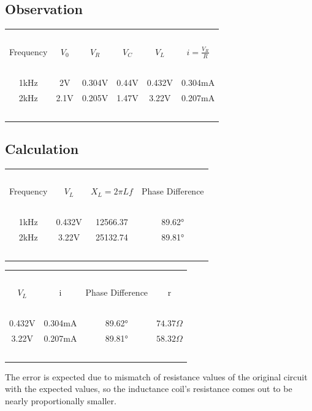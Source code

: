 \documentclass{article}
\begin{document}
\subsection{Observation}
\vspace{5px}
\begin{center}
\begin{tabular}{| c | c | c | c | c | c |} 
 \hline
    \ & \ & \ & \ & \ & \ \\
    Frequency & $V_0$ & $V_R$ & $V_C$ & $V_L$ & $i=\frac{V_R}{R}$\\ [1em]
    \hline
    \ & \ & \ & \ & \ & \ \\
    1kHz & 2V & 0.304V & 0.44V & 0.432V & 0.304mA \\
    2kHz & 2.1V & 0.205V & 1.47V & 3.22V & 0.207mA \\
    \ & \ & \ & \ & \ & \ \\
 \hline
\end{tabular}
\end{center}

\subsection{Calculation}
\vspace{5px}
\begin{center}
\begin{tabular}{| c | c | c | c |} 
 \hline
    \ & \ & \ & \ \\
    Frequency & $V_L$ & $X_L=2\pi Lf$ & Phase Difference \\ [1em]
    \hline
    \ & \ & \ & \ \\
    1kHz & 0.432V & 12566.37 & \ang{89.62} \\
    2kHz & 3.22V & 25132.74 & \ang{89.81} \\
    \ & \ & \ & \ \\
 \hline
\end{tabular}
\end{center}
\vspace{5px}
\begin{center}
\begin{tabular}{| c | c | c | c |} 
 \hline
    \ & \ & \ & \ \\
    $V_L$ & i & Phase Difference & r \\ [1em]
    \hline
    \ & \ & \ & \ \\
    0.432V & 0.304mA & \ang{89.62} &  $74.37\Omega$\\
    3.22V & 0.207mA & \ang{89.81} &  $58.32\Omega$\\
    \ & \ & \ & \ \\
 \hline
\end{tabular}
\end{center}
The error is expected due to mismatch of resistance values of the original circuit with the expected values, so the inductance coil’s resistance comes out to be nearly proportionally smaller.
\end{document}
